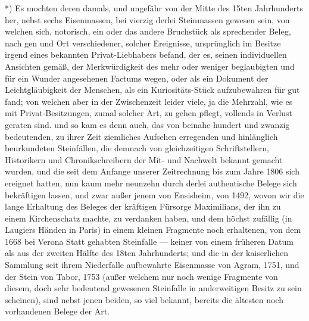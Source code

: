 \documentclass[a4paper, 11pt, oneside, german]{article}
\begin{document}
*) Es mochten deren damals, und ungefähr von der Mitte des 15ten Jahrhunderts her, nebst sechs Eisenmassen, bei vierzig derlei Steinmassen gewesen sein, von welchen sich, notorisch, ein oder das andere Bruchstück als sprechender Beleg, nach gen und Ort verschiedener, solcher Ereignisse, ursprünglich im Besitze irgend eines bekannten Privat-Liebhabers befand, der es, seinen individuellen Ansichten gemäß, der Merkwürdigkeit des mehr oder weniger beglaubigten und für ein Wunder angesehenen Factums wegen, oder als ein Dokument der Leichtgläubigkeit der Menschen, als ein Kuriositäts-Stück aufzubewahren für gut fand; von welchen aber in der Zwischenzeit leider viele, ja die Mehrzahl, wie es mit Privat-Besitzungen, zumal solcher Art, zu gehen pflegt, vollends in Verlust geraten sind. und so kam es denn auch, das von beinahe hundert und zwanzig bedeutenden, zu ihrer Zeit ziemliches Aufsehen erregenden und hinlänglich beurkundeten Steinfällen, die demnach von gleichzeitigen Schriftstellern, Historikern und Chronikschreibern der Mit- und Nachwelt bekannt gemacht wurden, und die seit dem Anfange unserer Zeitrechnung bis zum Jahre 1806 sich ereignet hatten, nun kaum mehr neunzehn durch derlei authentische Belege sich bekräftigen lassen, und zwar außer jenem von Ensisheim, von 1492, wovon wir die lange Erhaltung des Beleges der kräftigen Fürsorge Maximilians, der ihn zu einem Kirchenschatz machte, zu verdanken haben, und dem höchst zufällig (in Laugiers Händen in Paris) in einem kleinen Fragmente noch erhaltenen, von dem 1668 bei Verona Statt gehabten Steinfalle --- keiner von einem früheren Datum als aus der zweiten Hälfte des 18ten Jahrhunderts; und die in der kaiserlichen Sammlung seit ihrem Niederfalle aufbewahrte Eisenmasse von Agram, 1751, und der Stein von Tabor, 1753 (außer welchem nur noch wenige Fragmente von diesem, doch sehr bedeutend gewesenen Steinfalle in anderweitigen Besitz zu sein scheinen), sind nebst jenen beiden, so viel bekannt, bereits die ältesten noch vorhandenen Belege der Art.
\end{document}
